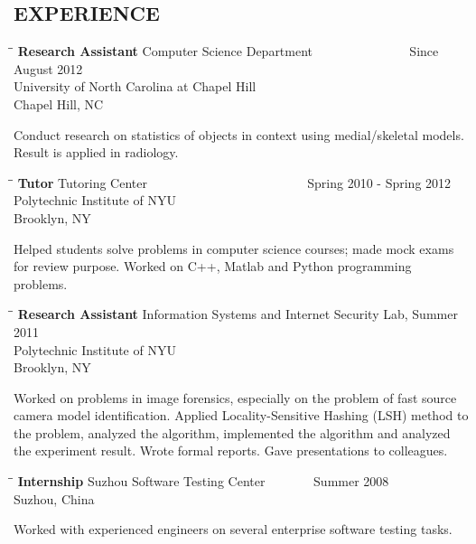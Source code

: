 \documentclass{res}
\begin{document}
\begin{resume}
\section{EXPERIENCE}
   \vspace{-0.05in}	
   \begin{tabbing}
   \hspace{2.3in}\= \hspace{2.6in}\= \kill %
    {\bf Research Assistant} \>Computer Science Department ~~~~~~~~~~~~~~  Since August 2012\\
    \> University of North Carolina at Chapel Hill  \\
                          \>Chapel Hill, NC
   \end{tabbing}\vspace{-20pt}
    Conduct research on statistics of objects in context using medial/skeletal models. Result is applied in radiology.
   \vspace{-0.1in}	
   \begin{tabbing}
   \hspace{2.3in}\= \hspace{2.6in}\= \kill %
    {\bf Tutor} \>Tutoring Center ~~~~~~~~~~~~~~~~~~~~~~~~ Spring 2010 - Spring 2012\\
    \> Polytechnic Institute of NYU\\
                          \>Brooklyn, NY
   \end{tabbing}\vspace{-20pt}
    Helped students solve problems in computer science courses; made mock exams for review purpose. Worked on C++, Matlab and Python programming problems.
       \begin{tabbing}
   \hspace{2.3in}\= \hspace{2.6in}\= \kill %
    {\bf Research Assistant} \> Information Systems and Internet Security Lab, Summer 2011 \\
    \>Polytechnic Institute of NYU  \\

                             \>Brooklyn, NY
   \end{tabbing}\vspace{-20pt}      %
     Worked on problems in image forensics, especially on the problem of fast source camera model identification. Applied Locality-Sensitive Hashing (LSH) method to the problem, analyzed the algorithm, implemented the algorithm and analyzed the experiment result. Wrote formal reports. Gave presentations to colleagues.
   \begin{tabbing}%
   \hspace{2.3in}\= \hspace{2.6in}\= \kill %
   {\bf Internship}  \>Suzhou Software Testing Center\> ~~~~~~~Summer  2008\\
                          \>Suzhou, China
   \end{tabbing}\vspace{-20pt}
    Worked with experienced engineers on several enterprise software testing tasks.   \\


\end{resume}
\end{document}
